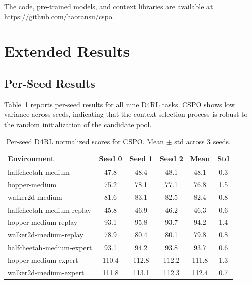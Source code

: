 \documentclass{article}
\newcommand{\cspo}{\textsc{CSPO}}
\begin{document}
The code, pre-trained models, and context libraries are available at \url{https://github.com/haoransu/cspo}.






\newpage
\appendix

\section{Extended Results}
\label{app:extended}

\subsection{Per-Seed Results}
\label{app:per_seed}

Table~\ref{tab:per_seed} reports per-seed results for all nine D4RL tasks. \cspo{} shows low variance across seeds, indicating that the context selection process is robust to the random initialization of the candidate pool.

\begin{table}[h]
\caption{Per-seed D4RL normalized scores for \cspo{}. Mean $\pm$ std across 3 seeds.}
\label{tab:per_seed}
\centering
\small
\begin{tabular}{lccccc}
\toprule
Environment & Seed 0 & Seed 1 & Seed 2 & Mean & Std \\
\midrule
halfcheetah-medium & 47.8 & 48.4 & 48.1 & 48.1 & 0.3 \\
hopper-medium & 75.2 & 78.1 & 77.1 & 76.8 & 1.5 \\
walker2d-medium & 81.6 & 83.1 & 82.5 & 82.4 & 0.8 \\
halfcheetah-medium-replay & 45.8 & 46.9 & 46.2 & 46.3 & 0.6 \\
hopper-medium-replay & 93.1 & 95.8 & 93.7 & 94.2 & 1.4 \\
walker2d-medium-replay & 78.9 & 80.4 & 80.1 & 79.8 & 0.8 \\
halfcheetah-medium-expert & 93.1 & 94.2 & 93.8 & 93.7 & 0.6 \\
hopper-medium-expert & 110.4 & 112.8 & 112.2 & 111.8 & 1.3 \\
walker2d-medium-expert & 111.8 & 113.1 & 112.3 & 112.4 & 0.7 \\
\bottomrule
\end{tabular}
\end{table}
\end{document}
